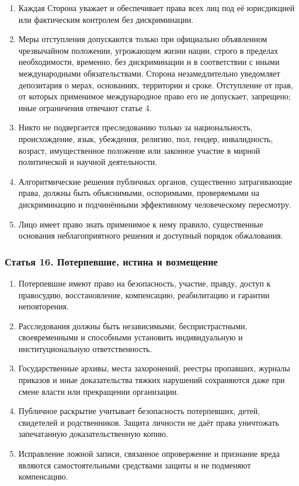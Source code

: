 \documentclass[
  russian,
  11pt,
  a4paper,
]{article}
\providecommand{\tightlist}{%
  \setlength{\itemsep}{0pt}\setlength{\parskip}{0pt}}
\begin{document}
\begin{enumerate}
\def\labelenumi{\arabic{enumi}.}
\tightlist
\item
  Каждая Сторона уважает и обеспечивает права всех лиц под её
  юрисдикцией или фактическим контролем без дискриминации.
\item
  Меры отступления допускаются только при официально объявленном
  чрезвычайном положении, угрожающем жизни нации, строго в пределах
  необходимости, временно, без дискриминации и в соответствии с иными
  международными обязательствами. Сторона незамедлительно уведомляет
  депозитария о мерах, основаниях, территории и сроке. Отступление от
  прав, от которых применимое международное право его не допускает,
  запрещено; иные ограничения отвечают статье 4.
\item
  Никто не подвергается преследованию только за национальность,
  происхождение, язык, убеждения, религию, пол, гендер, инвалидность,
  возраст, имущественное положение или законное участие в мирной
  политической и научной деятельности.
\item
  Алгоритмические решения публичных органов, существенно затрагивающие
  права, должны быть объяснимыми, оспоримыми, проверяемыми на
  дискриминацию и подчинёнными эффективному человеческому пересмотру.
\item
  Лицо имеет право знать применимое к нему правило, существенные
  основания неблагоприятного решения и доступный порядок обжалования.
\end{enumerate}

\subsubsection{Статья 16. Потерпевшие, истина и
возмещение}\label{ux441ux442ux430ux442ux44cux44f-16-ux43fux43eux442ux435ux440ux43fux435ux432ux448ux438ux435-ux438ux441ux442ux438ux43dux430-ux438-ux432ux43eux437ux43cux435ux449ux435ux43dux438ux435}

\begin{enumerate}
\def\labelenumi{\arabic{enumi}.}
\tightlist
\item
  Потерпевшие имеют право на безопасность, участие, правду, доступ к
  правосудию, восстановление, компенсацию, реабилитацию и гарантии
  неповторения.
\item
  Расследования должны быть независимыми, беспристрастными,
  своевременными и способными установить индивидуальную и
  институциональную ответственность.
\item
  Государственные архивы, места захоронений, реестры пропавших, журналы
  приказов и иные доказательства тяжких нарушений сохраняются даже при
  смене власти или прекращении организации.
\item
  Публичное раскрытие учитывает безопасность потерпевших, детей,
  свидетелей и родственников. Защита личности не даёт права уничтожать
  запечатанную доказательственную копию.
\item
  Исправление ложной записи, связанное опровержение и признание вреда
  являются самостоятельными средствами защиты и не подменяют
  компенсацию.
\end{enumerate}
\end{document}
